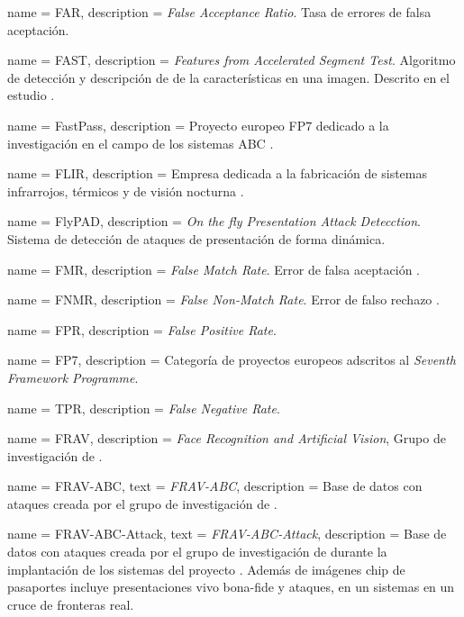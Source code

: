 {
    name        = {FAR},
    description = {\textit{False Acceptance Ratio}. Tasa de errores de falsa aceptación.}
}

{
    name        = {FAST},
    description = {\textit{Features from Accelerated Segment Test}. Algoritmo de detección y descripción de de la características en una imagen. Descrito en el estudio  \cite{rosten2006machine}.}
}

{
    name        = {FastPass},
    description = {Proyecto europeo FP$7$ dedicado a la investigación en el campo de los sistemas ABC \cite{FastPassOnline}.}
}

{
    name        = {FLIR},
    description = {Empresa dedicada a la fabricación de sistemas infrarrojos, térmicos y de visión nocturna \cite{FLIROnline}.}
}

{
    name        = {FlyPAD},
    description = {\textit{On the fly Presentation Attack Detecction}. Sistema de detección de ataques de presentación de forma dinámica.}
}

{
    name        = {FMR},
    description = {\textit{False Match Rate}. Error de falsa aceptación .}
}

{
    name        = {FNMR},
    description = {\textit{False Non-Match Rate}. Error de falso rechazo .}
}

{
    name        = {FPR},
    description = {\textit{False Positive Rate}.}
}

{
    name        = {FP7},
    description = {Categoría de proyectos europeos adscritos al \textit{Seventh Framework Programme}.}
}

{
    name        = {TPR},
    description = {\textit{False Negative Rate}.}
}

{
    name        = {FRAV},
    description = {\textit{Face Recognition and Artificial Vision}, Grupo de investigación de  \cite{FRAVOnline}.}
}

{
    name        = {FRAV-ABC},
    text        = {\mbox{\textit{FRAV-ABC}}},
    description = {Base de datos con ataques creada por el grupo de investigación   de .}
}

{
    name        = {FRAV-ABC-Attack},
    text        = {\mbox{\textit{FRAV-ABC-Attack}}},
    description = {Base de datos con ataques creada por el grupo de investigación  de  durante la implantación de los sistemas  del proyecto . Además de imágenes \gls{chip} de pasaportes incluye presentaciones \gls{vivo bona-fide} y ataques, en un sistemas  en un cruce de fronteras real.}
}

